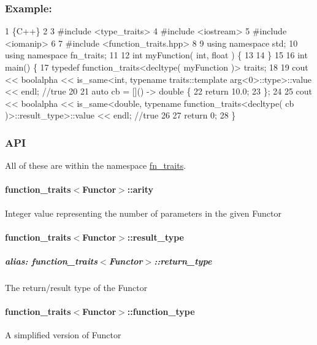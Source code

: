 \subsubsection*{Example\+:}


\begin{DoxyCode}
1 \{C++\}
2 
3 #include <type\_traits>
4 #include <iostream>
5 #include <iomanip>
6 
7 #include <function\_traits.hpp>
8 
9 using namespace std;
10 using namespace fn\_traits;
11 
12 int myFunction( int, float ) \{
13 
14 \}
15 
16 int main() \{
17     typedef function\_traits<decltype( myFunction )> traits;
18 
19     cout << boolalpha << is\_same<int, typename traits::template arg<0>::type>::value << endl; //true
20 
21     auto cb = []() -> double \{
22         return 10.0;
23     \};
24 
25     cout << boolalpha << is\_same<double, typename function\_traits<decltype( cb )>::result\_type>::value <<
       endl; //true
26 
27     return 0;
28 \}
\end{DoxyCode}


\subsubsection*{A\+PI}

All of these are within the namespace {\ttfamily \hyperlink{namespacefn__traits}{fn\+\_\+traits}}.

\paragraph*{{\ttfamily function\+\_\+traits$<$Functor$>$\+::arity}}

Integer value representing the number of parameters in the given Functor

\paragraph*{{\ttfamily function\+\_\+traits$<$Functor$>$\+::result\+\_\+type}}

\subparagraph*{alias\+: {\ttfamily function\+\_\+traits$<$Functor$>$\+::return\+\_\+type}}

The return/result type of the Functor

\paragraph*{{\ttfamily function\+\_\+traits$<$Functor$>$\+::function\+\_\+type}}

A simplified version of Functor


